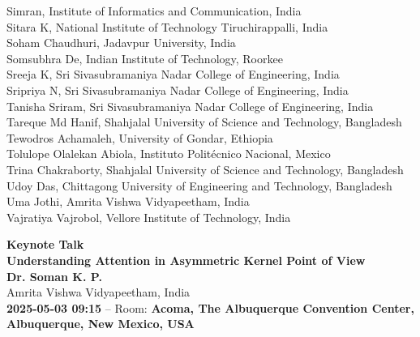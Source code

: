 \documentclass[11pt,oneside]{book}
\begin{document}
\begin{description}
              Simran, Institute of Informatics and Communication, India\\
              Sitara K, National Institute of Technology Tiruchirappalli, India\\
              Soham Chaudhuri, Jadavpur University, India\\
              Somsubhra De, Indian Institute of Technology, Roorkee\\
              Sreeja K, Sri Sivasubramaniya Nadar College of Engineering, India\\
              Sripriya N, Sri Sivasubramaniya Nadar College of Engineering, India\\
              Tanisha Sriram, Sri Sivasubramaniya Nadar College of Engineering, India\\
              Tareque Md Hanif, Shahjalal University of Science and Technology, Bangladesh\\
              Tewodros Achamaleh, University of Gondar, Ethiopia\\
              Tolulope Olalekan Abiola, Instituto Politécnico Nacional, Mexico\\
              Trina Chakraborty, Shahjalal University of Science and Technology, Bangladesh\\
              Udoy Das, Chittagong University of Engineering and Technology, Bangladesh\\
              Uma Jothi, Amrita Vishwa Vidyapeetham, India\\
              Vajratiya Vajrobol, Vellore Institute of Technology, India\\
\end{description}
\newpage

  \begin{center}
          {\Large \textbf{Keynote Talk}\\}
      {\LARGE \textbf{Understanding Attention in Asymmetric Kernel Point of View}\\}
        \vspace*{0.5cm}
    \textbf{Dr. Soman K. P.}\\
        Amrita Vishwa Vidyapeetham, India\\
        
        
        \textbf{2025-05-03 09:15} -- 
                Room: \textbf{Acoma, The Albuquerque Convention Center, Albuquerque, New Mexico, USA}\\
        
  \end{center}
\end{document}
